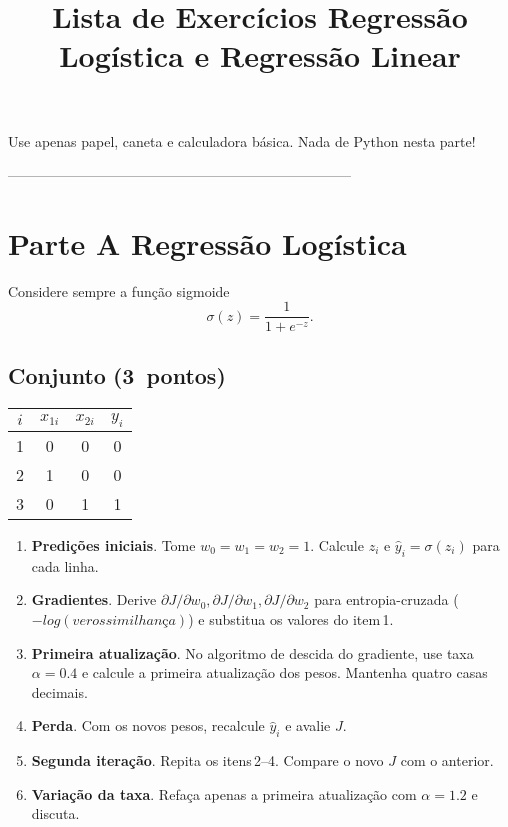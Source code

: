 \documentclass[12pt]{article}
\title{Lista de Exercícios \textemdash{} Regressão Logística e Regressão Linear}
\author{}
\date{}
\begin{document}
\maketitle

Use apenas papel, caneta e calculadora básica. Nada de Python nesta parte!

--------------------------------------------------------------------------
\section*{Parte A \;\textemdash\; Regressão Logística}

Considere sempre a função sigmoide
\[
\sigma(z)=\frac{1}{1+e^{-z}}.
\]

\subsection*{Conjunto\,\scriptsize{\,(3~pontos)}}

\begin{center}
\begin{tabular}{cccc}
\toprule
\(i\) & \(x_{1i}\) & \(x_{2i}\) & \(y_i\)\\
\midrule
1 & 0 & 0 & 0\\
2 & 1 & 0 & 0\\
3 & 0 & 1 & 1\\
\bottomrule
\end{tabular}
\end{center}

\begin{enumerate}
  \item \textbf{Predições iniciais}. Tome \(w_0=w_1=w_2=1\). Calcule \(z_i\) e \(\hat y_i=\sigma(z_i)\) para cada linha.
  \item \textbf{Gradientes}. Derive \(\partial J/\partial w_0,\partial J/\partial w_1,\partial J/\partial w_2\) para entropia-cruzada ($-log(verossimilhança)$) e substitua os valores do item\,1.
  \item \textbf{Primeira atualização}. No algoritmo de descida do gradiente, use taxa \(\alpha=0.4\) e calcule a primeira atualização dos pesos. Mantenha quatro casas decimais.
  \item \textbf{Perda}. Com os novos pesos, recalcule \(\hat y_i\) e avalie \(J\).
  \item \textbf{Segunda iteração}. Repita os itens\,2--4. Compare o novo \(J\) com o anterior.
  \item \textbf{Variação da taxa}. Refaça apenas a primeira atualização com \(\alpha=1.2\) e discuta.
\end{enumerate}
\end{document}
